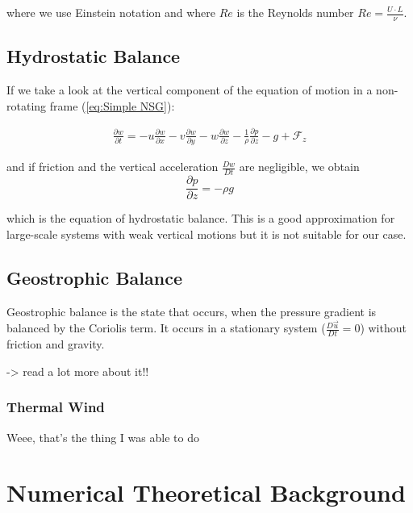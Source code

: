 \documentclass[12pt, a4paper, twoside]{article}
\begin{document}
			where we use Einstein notation and where $Re$ is the Reynolds number $Re = \frac{U\cdot L}{\nu}$.
	
	\subsection{Hydrostatic Balance} %
		If we take a look at the vertical component of the equation of motion in a non-rotating frame (\ref{eq:Simple NSG}):
		
		\begin{eqnarray}
		\frac{\partial w}{\partial t} = - u \frac{\partial w}{\partial x} - v \frac{\partial w}{\partial y} - w \frac{\partial w}{\partial z} - \frac{1}{\rho} \frac{\partial p}{\partial z} - g + \mathcal{F}_z
		\label{eq:Simple NSG z}
		\end{eqnarray}
		
		and if friction and the vertical acceleration $\frac{Dw}{Dt}$ are negligible, we obtain
		\begin{equation}
		\frac{\partial p}{\partial z} = -\rho g
		\label{eq:Hydrostat Balance}
		\end{equation}
	
		which is the equation of hydrostatic balance. This is a good approximation for large-scale systems with weak vertical motions but it is not suitable for our case.
		
	\subsection{Geostrophic Balance}
		Geostrophic balance is the state that occurs, when the pressure gradient is balanced by the Coriolis term. It occurs in a stationary system ($\frac{D\vec{u}}{Dt}=0$) without friction and gravity.
		
		-> read a lot more about it!!
	
		\subsubsection{Thermal Wind}
			Weee, that's the thing I was able to do

	\newpage		
\section{Numerical Theoretical Background}
\end{document}
